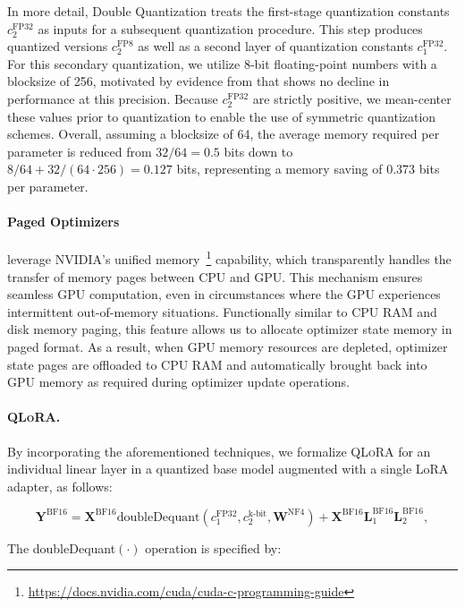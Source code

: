 In more detail, Double Quantization treats the first-stage quantization constants $c_2^{\text{FP32}}$ as inputs for a subsequent quantization procedure. This step produces quantized versions $c_2^{\text{FP8}}$ as well as a second layer of quantization constants $c_1^{\text{FP32}}$. For this secondary quantization, we utilize 8-bit floating-point numbers with a blocksize of 256, motivated by evidence from \citet{dettmers2022case} that shows no decline in performance at this precision. Because $c_2^{\text{FP32}}$ are strictly positive, we mean-center these values prior to quantization to enable the use of symmetric quantization schemes. Overall, assuming a blocksize of 64, the average memory required per parameter is reduced from $32/64=0.5$ bits down to $8/64 + 32/(64\cdot256) = 0.127$ bits, representing a memory saving of 0.373 bits per parameter.

\paragraph{Paged Optimizers} leverage NVIDIA’s unified memory~\footnote{\tiny \url{https://docs.nvidia.com/cuda/cuda-c-programming-guide}} capability, which transparently handles the transfer of memory pages between CPU and GPU. This mechanism ensures seamless GPU computation, even in circumstances where the GPU experiences intermittent out-of-memory situations. Functionally similar to CPU RAM and disk memory paging, this feature allows us to allocate optimizer state memory in paged format. As a result, when GPU memory resources are depleted, optimizer state pages are offloaded to CPU RAM and automatically brought back into GPU memory as required during optimizer update operations.

\paragraph{\textsc{QLoRA}.} By incorporating the aforementioned techniques, we formalize \textsc{QLoRA} for an individual linear layer in a quantized base model augmented with a single LoRA adapter, as follows:

\begin{equation}
    \mathbf{Y}^{\text{BF16}} =  \mathbf{X}^{\text{BF16}} \text{doubleDequant}(c_1^{\text{FP32}}, c_2^{\text{k-bit}}, \mathbf{W}^{\text{NF4}}) + \mathbf{X}^{\text{BF16}}\mathbf{L}^{\text{BF16}}_1\mathbf{L}^{\text{BF16}}_2,
\end{equation}

The doubleDequant$(\cdot)$ operation is specified by:


